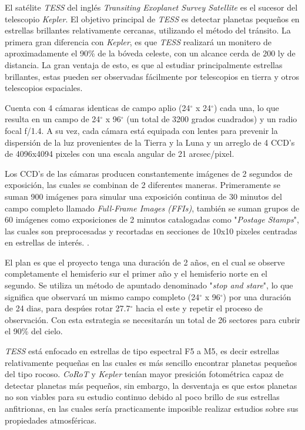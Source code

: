 El satélite \textit{TESS} del inglés \textit{Transiting Exoplanet Survey Satellite} es el sucesor del telescopio \textit{Kepler}. El objetivo principal de \textit{TESS} es detectar planetas pequeños en estrellas brillantes relativamente cercanas, utilizando el método del tránsito. La primera gran diferencia con \textit{Kepler}, es que \textit{TESS} realizará un monitero de aproximadamente el 90\% de la bóveda celeste, con un alcance cerda de 200 ly de distancia. La gran ventaja de esto, es que al estudiar principalmente estrellas brillantes, estas pueden ser observadas fácilmente por telescopios en tierra y otros telescopios espaciales. 

Cuenta con 4 cámaras identicas de campo aplio (24$^{\circ}$ x 24$^{\circ}$) cada una, lo que resulta en un campo de 24$^{\circ}$ x 96$^{\circ}$ (un total de 3200 grados cuadrados) y un radio focal f/1.4. A su vez, cada cámara está equipada con lentes para prevenir la dispersión de la luz provenientes de la Tierra y la Luna y un arreglo de 4 CCD’s de 4096x4094 pixeles con una escala angular de 21 arcsec/pixel.

Los CCD's de las cámaras producen constantemente imágenes de 2 segundos de exposición, las cuales se combinan de 2 diferentes maneras. Primeramente se suman 900 imágenes para simular una exposición continua de 30 minutos del campo completo llamado \textit{ Full-Frame Images (FFIs)}, también se suman grupos de 60 imágenes como exposiciones de 2 minutos catalogadas como "\textit{Postage Stamps}", las cuales son preprocesadas y recortadas en secciones de 10x10 pixeles centradas en estrellas de interés. \cite{ricker2014transiting}.

El plan es que el proyecto tenga una duración de 2 años, en el cual se observe completamente el hemisferio sur el primer año y el hemisferio norte en el segundo. Se utiliza un método de apuntado denominado "\textit{stop and stare}", lo que significa que observará un mismo campo completo (24$^{\circ}$ x 96$^{\circ}$) por una duración de 24 dias, para despúes rotar 27.7$^{\circ}$ hacia el este y repetir el proceso de observación. Con esta estrategia se necesitarán un total de 26 sectores para cubrir el 90\% del cielo. \cite{schliegel2017tess}

\textit{TESS} está enfocado en estrellas de tipo espectral F5 a M5, es decir estrellas relativamente pequeñas en las cuales es más sencillo encontrar planetas pequeños del tipo rocoso. \textit{CoRoT} y \textit{Kepler} tenían mayor presición fotométrica capaz de detectar planetas más pequeños, sin embargo, la desventaja es que estos planetas no son viables para su estudio continuo debido al poco brillo de sus estrellas anfitrionas, en las cuales sería practicamente imposible realizar estudios sobre sus propiedades atmosféricas. \cite{sullivan2015transiting} 

